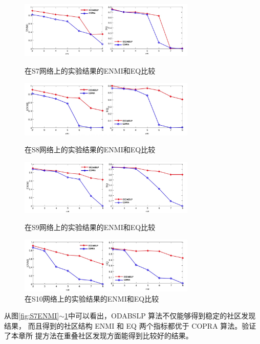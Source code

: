 \begin{figure}
  \centering
  \includegraphics[width=0.75\textwidth]{figures/S7ENMI}
  \caption{在S7网络上的实验结果的ENMI和EQ比较}\label{fig:S7ENMI}

  \includegraphics[width=0.75\textwidth]{figures/S8ENMI}
  \caption{在S8网络上的实验结果的ENMI和EQ比较}\label{fig:S8ENMI}

  \includegraphics[width=0.75\textwidth]{figures/S9ENMI}
  \caption{在S9网络上的实验结果的ENMI和EQ比较}\label{fig:S9ENMI}

  \includegraphics[width=0.75\textwidth]{figures/S10ENMI}
  \caption{在S10网络上的实验结果的ENMI和EQ比较}\label{fig:S10ENMI}

\end{figure}

从图\ref{fig:S7ENMI}$\sim$\ref{fig:S10ENMI}中可以看出，ODABSLP 算法不仅能够得到稳定的社区发现结果，
而且得到的社区结构 ENMI 和 EQ 两个指标都优于 COPRA 算法。验证了本章所
提方法在重叠社区发现方面能得到比较好的结果。





